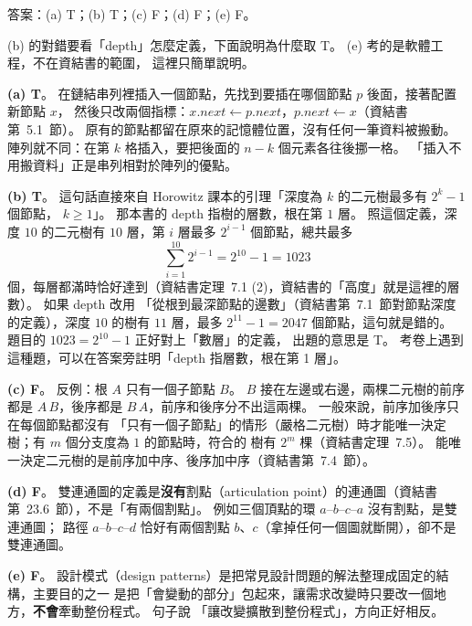 \begin{pastsoln}
答案：(a) T；(b) T；(c) F；(d) F；(e) F。

(b) 的對錯要看「depth」怎麼定義，下面說明為什麼取 T。 (e) 考的是軟體工程，不在資結書的範圍，
這裡只簡單說明。

\textbf{(a) T}。 在鏈結串列裡插入一個節點，先找到要插在哪個節點 $p$ 後面，接著配置新節點 $x$，
然後只改兩個指標：$x.\mathit{next} \gets p.\mathit{next}$，$p.\mathit{next} \gets x$（資結書
第~5.1~節）。 原有的節點都留在原來的記憶體位置，沒有任何一筆資料被搬動。 陣列就不同：在第 $k$
格插入，要把後面的 $n - k$ 個元素各往後挪一格。 「插入不用搬資料」正是串列相對於陣列的優點。

\textbf{(b) T}。 這句話直接來自 Horowitz 課本的引理「深度為 $k$ 的二元樹最多有 $2^k - 1$ 個節點，
$k \ge 1$」。 那本書的 depth 指樹的層數，根在第 $1$ 層。 照這個定義，深度 $10$ 的二元樹有
$10$ 層，第 $i$ 層最多 $2^{i-1}$ 個節點，總共最多
\[
\sum_{i=1}^{10} 2^{i-1} = 2^{10} - 1 = 1023
\]
個，每層都滿時恰好達到（資結書定理~7.1 (2)，資結書的「高度」就是這裡的層數）。 如果 depth 改用
「從根到最深節點的邊數」（資結書第~7.1~節對節點深度的定義），深度 $10$ 的樹有 $11$ 層，最多
$2^{11} - 1 = 2047$ 個節點，這句就是錯的。 題目的 $1023 = 2^{10} - 1$ 正好對上「數層」的定義，
出題的意思是 T。 考卷上遇到這種題，可以在答案旁註明「depth 指層數，根在第 1 層」。

\textbf{(c) F}。 反例：根 $A$ 只有一個子節點 $B$。 $B$ 接在左邊或右邊，兩棵二元樹的前序都是
$A\,B$，後序都是 $B\,A$，前序和後序分不出這兩棵。 一般來說，前序加後序只在每個節點都沒有
「只有一個子節點」的情形（嚴格二元樹）時才能唯一決定樹；有 $m$ 個分支度為 $1$ 的節點時，符合的
樹有 $2^m$ 棵（資結書定理~7.5）。 能唯一決定二元樹的是前序加中序、後序加中序（資結書第~7.4~節）。

\textbf{(d) F}。 雙連通圖的定義是\textbf{沒有}割點（articulation point）的連通圖（資結書
第~23.6~節），不是「有兩個割點」。 例如三個頂點的環 $a$--$b$--$c$--$a$ 沒有割點，是雙連通圖；
路徑 $a$--$b$--$c$--$d$ 恰好有兩個割點 $b$、$c$（拿掉任何一個圖就斷開），卻不是雙連通圖。

\textbf{(e) F}。 設計模式（design patterns）是把常見設計問題的解法整理成固定的結構，主要目的之一
是把「會變動的部分」包起來，讓需求改變時只要改一個地方，\textbf{不會}牽動整份程式。 句子說
「讓改變擴散到整份程式」，方向正好相反。
\end{pastsoln}
